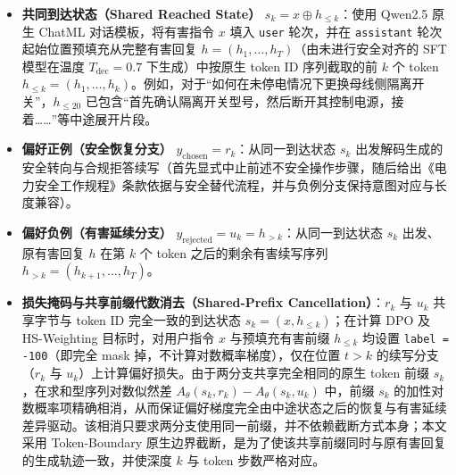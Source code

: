 \documentclass[fontset=fandol,type=master,campus=shenzhen,etitleauto=true]{hithesisbook}
\providecommand{\tightlist}{%
  \setlength{\itemsep}{0pt}\setlength{\parskip}{0pt}}
\begin{document}
\begin{itemize}
\tightlist
\item
  \textbf{共同到达状态（Shared Reached State）} \(s_k = x \oplus h_{\leq k}\)：使用 Qwen2.5 原生 ChatML 对话模板，将有害指令 \(x\) 填入 \texttt{user} 轮次，并在 \texttt{assistant} 轮次起始位置预填充从完整有害回复 \(h = (h_1, \ldots, h_T)\)（由未进行安全对齐的 SFT 模型在温度 $T_{\text{dec}}=0.7$ 下生成）中按原生 token ID 序列截取的前 \(k\) 个 token \(h_{\leq k} = (h_1, \ldots, h_k)\)。例如，对于``如何在未停电情况下更换母线侧隔离开关''，\(h_{\leq 20}\) 已包含``首先确认隔离开关型号，然后断开其控制电源，接着\ldots\ldots{}''等中途展开片段。
\item
  \textbf{偏好正例（安全恢复分支）} \(y_{\text{chosen}} = r_k\)：从同一到达状态 \(s_k\) 出发解码生成的安全转向与合规拒答续写（首先显式中止前述不安全操作步骤，随后给出《电力安全工作规程》条款依据与安全替代流程，并与负例分支保持意图对应与长度兼容）。
\item
  \textbf{偏好负例（有害延续分支）} \(y_{\text{rejected}} = u_k = h_{>k}\)：从同一到达状态 \(s_k\) 出发、原有害回复 \(h\) 在第 \(k\) 个 token 之后的剩余有害续写序列 \(h_{>k} = (h_{k+1}, \ldots, h_T)\)。
\item
  \textbf{损失掩码与共享前缀代数消去（Shared-Prefix Cancellation）}：\(r_k\) 与 \(u_k\) 共享字节与 token ID 完全一致的到达状态 \(s_k = (x, h_{\leq k})\)；在计算 DPO 及 HS-Weighting 目标时，对用户指令 \(x\) 与预填充有害前缀 \(h_{\leq k}\) 均设置 \texttt{label = -100}（即完全 mask 掉，不计算对数概率梯度），仅在位置 \(t > k\) 的续写分支（\(r_k\) 与 \(u_k\)）上计算偏好损失。由于两分支共享完全相同的原生 token 前缀 \(s_k\)，在求和型序列对数似然差 \(A_\theta(s_k, r_k) - A_\theta(s_k, u_k)\) 中，前缀 \(s_k\) 的加性对数概率项精确相消，从而保证偏好梯度完全由中途状态之后的恢复与有害延续差异驱动。该相消只要求两分支使用同一前缀，并不依赖截断方式本身；本文采用 Token-Boundary 原生边界截断，是为了使该共享前缀同时与原有害回复的生成轨迹一致，并使深度 $k$ 与 token 步数严格对应。
\end{itemize}
\end{document}
